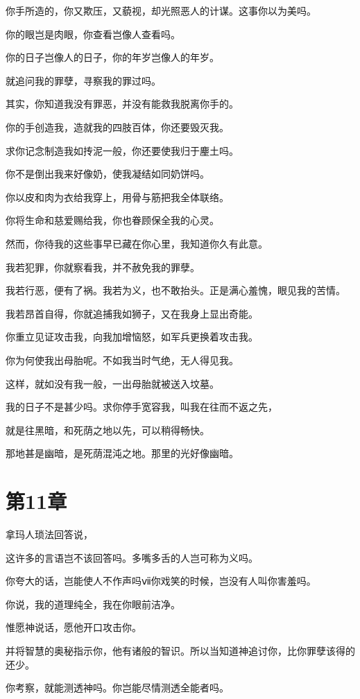 \documentclass[12pt,oneside]{book}
\begin{document}
你手所造的，你又欺压，又藐视，却光照恶人的计谋。这事你以为美吗。

你的眼岂是肉眼，你查看岂像人查看吗。

你的日子岂像人的日子，你的年岁岂像人的年岁。

就追问我的罪孽，寻察我的罪过吗。

其实，你知道我没有罪恶，并没有能救我脱离你手的。

你的手创造我，造就我的四肢百体，你还要毁灭我。

求你记念制造我如抟泥一般，你还要使我归于麈土吗。

你不是倒出我来好像奶，使我凝结如同奶饼吗。

你以皮和肉为衣给我穿上，用骨与筋把我全体联络。

你将生命和慈爱赐给我，你也眷顾保全我的心灵。

然而，你待我的这些事早已藏在你心里，我知道你久有此意。

我若犯罪，你就察看我，并不赦免我的罪孽。

我若行恶，便有了祸。我若为义，也不敢抬头。正是满心羞愧，眼见我的苦情。

我若昂首自得，你就追捕我如狮子，又在我身上显出奇能。

你重立见证攻击我，向我加增恼怒，如军兵更换着攻击我。

你为何使我出母胎呢。不如我当时气绝，无人得见我。

这样，就如没有我一般，一出母胎就被送入坟墓。

我的日子不是甚少吗。求你停手宽容我，叫我在往而不返之先，

就是往黑暗，和死荫之地以先，可以稍得畅快。

那地甚是幽暗，是死荫混沌之地。那里的光好像幽暗。



\chapter{第11章}
拿玛人琐法回答说，

这许多的言语岂不该回答吗。多嘴多舌的人岂可称为义吗。

你夸大的话，岂能使人不作声吗ⅶ你戏笑的时候，岂没有人叫你害羞吗。

你说，我的道理纯全，我在你眼前洁净。

惟愿神说话，愿他开口攻击你。

并将智慧的奥秘指示你，他有诸般的智识。所以当知道神追讨你，比你罪孽该得的还少。

你考察，就能测透神吗。你岂能尽情测透全能者吗。
\end{document}

